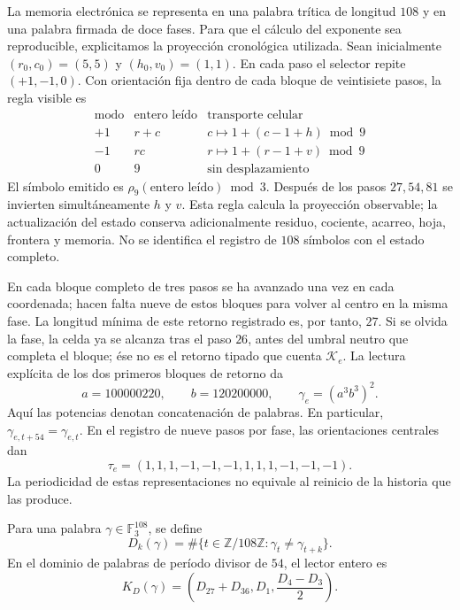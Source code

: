 La memoria electrónica se representa en una palabra trítica de longitud
\(108\) y en una palabra firmada de doce fases. Para que el cálculo del
exponente sea reproducible, explicitamos la proyección cronológica
utilizada. Sean inicialmente
\((r_0,c_0)=(5,5)\) y \((h_0,v_0)=(1,1)\). En cada paso el selector
repite \((+1,-1,0)\). Con orientación fija dentro de cada bloque de
veintisiete pasos, la regla visible es
\[
 \begin{array}{c|c|c}
 \text{modo}&\text{entero leído}&\text{transporte celular}\\\hline
 +1&r+c&c\mapsto1+(c-1+h)\bmod9\\
 -1&rc&r\mapsto1+(r-1+v)\bmod9\\
 0&9&\text{sin desplazamiento}
 \end{array}
\]
El símbolo emitido es \(\rho_9(\text{entero leído})\bmod3\).
Después de los pasos \(27,54,81\) se invierten simultáneamente
\(h\) y \(v\). Esta regla calcula la proyección observable; la
actualización del estado conserva adicionalmente residuo, cociente,
acarreo, hoja, frontera y memoria. No se identifica el registro de
\(108\) símbolos con el estado completo.

En cada bloque completo de tres pasos se ha avanzado una vez en cada
coordenada; hacen falta nueve de estos bloques para volver al centro en
la misma fase. La longitud mínima de este retorno registrado es, por
tanto, \(27\). Si se olvida la fase, la celda ya se alcanza tras el
paso \(26\), antes del umbral neutro que completa el bloque; ése no es
el retorno tipado que cuenta \(\mathcal K_e\). La lectura explícita
de los dos primeros bloques de retorno da
\begin{equation}
 a=100000220,\qquad b=120200000,\qquad
 \gamma_e=(a^3b^3)^2.
 \label{eq:el-palabra}
\end{equation}
Aquí las potencias denotan concatenación de palabras. En particular,
\(\gamma_{e,t+54}=\gamma_{e,t}\). En el registro de nueve pasos por
fase, las orientaciones centrales dan
\begin{equation}
 \tau_e=(1,1,1,-1,-1,-1,1,1,1,-1,-1,-1).
 \label{eq:el-tau}
\end{equation}
La periodicidad de estas representaciones no equivale al reinicio de la
historia que las produce.

\begin{definition}
Para una palabra \(\gamma\in\mathbb F_3^{108}\), se define
\[
 D_k(\gamma)=\#\{t\in\mathbb Z/108\mathbb Z:
                   \gamma_t\ne\gamma_{t+k}\}.
\]
En el dominio de palabras de período divisor de \(54\), el lector
entero es
\begin{equation}
 K_D(\gamma)=\left(D_{27}+D_{36},D_1,\frac{D_4-D_3}{2}\right).
 \label{eq:el-kd}
\end{equation}
\end{definition}

